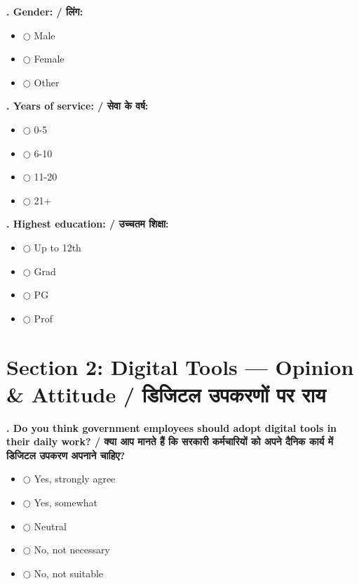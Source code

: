 \documentclass[11pt,a4paper]{article}
\newcounter{qcounter}
\begin{document}
\textbf{. Gender: / लिंग:}
\vspace{0.1cm}
\begin{itemize}[label=, itemsep=0.1cm, leftmargin=0.5cm]
    \item $\bigcirc$ Male
    \item $\bigcirc$ Female
    \item $\bigcirc$ Other
\end{itemize}
\vspace{0.2cm}

\textbf{. Years of service: / सेवा के वर्ष:}
\vspace{0.1cm}
\begin{itemize}[label=, itemsep=0.1cm, leftmargin=0.5cm]
    \item $\bigcirc$ 0-5
    \item $\bigcirc$ 6-10
    \item $\bigcirc$ 11-20
    \item $\bigcirc$ 21+
\end{itemize}
\vspace{0.2cm}

\textbf{. Highest education: / उच्चतम शिक्षा:}
\vspace{0.1cm}
\begin{itemize}[label=, itemsep=0.1cm, leftmargin=0.5cm]
    \item $\bigcirc$ Up to 12th
    \item $\bigcirc$ Grad
    \item $\bigcirc$ PG
    \item $\bigcirc$ Prof
\end{itemize}
\vspace{0.2cm}


\section*{Section 2: Digital Tools — Opinion & Attitude / डिजिटल उपकरणों पर राय}
\vspace{0.2cm}
\textbf{. Do you think government employees should adopt digital tools in their daily work? / क्या आप मानते हैं कि सरकारी कर्मचारियों को अपने दैनिक कार्य में डिजिटल उपकरण अपनाने चाहिए?}
\vspace{0.1cm}
\begin{itemize}[label=, itemsep=0.1cm, leftmargin=0.5cm]
    \item $\bigcirc$ Yes, strongly agree
    \item $\bigcirc$ Yes, somewhat
    \item $\bigcirc$ Neutral
    \item $\bigcirc$ No, not necessary
    \item $\bigcirc$ No, not suitable
\end{itemize}
\vspace{0.2cm}
\end{document}
